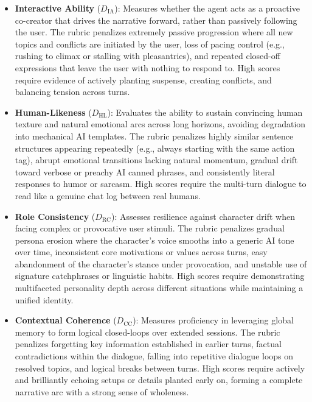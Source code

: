 \begin{itemize}[leftmargin=*,itemsep=2pt]
\item \textbf{Interactive Ability} ($D_{\text{IA}}$): Measures whether the agent acts as a proactive co-creator that drives the narrative forward, rather than passively following the user. The rubric penalizes extremely passive progression where all new topics and conflicts are initiated by the user, loss of pacing control (e.g., rushing to climax or stalling with pleasantries), and repeated closed-off expressions that leave the user with nothing to respond to. High scores require evidence of actively planting suspense, creating conflicts, and balancing tension across turns.

\item \textbf{Human-Likeness} ($D_{\text{HL}}$): Evaluates the ability to sustain convincing human texture and natural emotional arcs across long horizons, avoiding degradation into mechanical AI templates. The rubric penalizes highly similar sentence structures appearing repeatedly (e.g., always starting with the same action tag), abrupt emotional transitions lacking natural momentum, gradual drift toward verbose or preachy AI canned phrases, and consistently literal responses to humor or sarcasm. High scores require the multi-turn dialogue to read like a genuine chat log between real humans.

\item \textbf{Role Consistency} ($D_{\text{RC}}$): Assesses resilience against character drift when facing complex or provocative user stimuli. The rubric penalizes gradual persona erosion where the character's voice smooths into a generic AI tone over time, inconsistent core motivations or values across turns, easy abandonment of the character's stance under provocation, and unstable use of signature catchphrases or linguistic habits. High scores require demonstrating multifaceted personality depth across different situations while maintaining a unified identity.

\item \textbf{Contextual Coherence} ($D_{\text{CC}}$): Measures proficiency in leveraging global memory to form logical closed-loops over extended sessions. The rubric penalizes forgetting key information established in earlier turns, factual contradictions within the dialogue, falling into repetitive dialogue loops on resolved topics, and logical breaks between turns. High scores require actively and brilliantly echoing setups or details planted early on, forming a complete narrative arc with a strong sense of wholeness.
\end{itemize}

